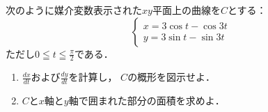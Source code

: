\documentclass[../../main.tex]{subfiles}
\begin{document}
次のように媒介変数表示された$xy$平面上の曲線を$C$とする：
\[
  \begin{cases} x=3\cos t-\cos3t \\ y=3\sin t-\sin3t
\end{cases} \]
ただし$\displaystyle0 \leqq t \leqq \frac{\pi}{2}$である．
\begin{enumerate}
  \item$\displaystyle\frac{dx}{dt}$および$\displaystyle\frac{dy}{dt}$を計算し，
    $C$の概形を図示せよ．
  \item$C$と$x$軸と$y$軸で囲まれた部分の面積を求めよ．
\end{enumerate}
\end{document}
